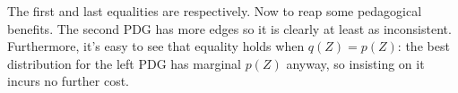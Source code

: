 \documentclass[twoside]{article}
\makeatletter
\theoremstyle{plain}
\theoremstyle{definition}
\let\H\relax
\DeclareMathOperator{\H}{\mathrm{H}} %
\DeclareMathOperator*{\Ex}{\mathbb{E}} %
\newcommand{\datadist}[1]{\Pr\nolimits_{#1}}
\newcommand\Inc{\mathit{Inc}}
\newcommand\aar{\@ifstar\aar@one@star\aar@plain}
\newcommand\aar@one@star{\@ifstar\aar@resize{\aar@plain*}}
\newcommand\aar@resize[1]{\sbox{\aar@content}{#1}\scaleleftright[3.8ex]
			{\Biggl\langle\!\!\!\!\Biggl\langle}{\usebox{\aar@content}}
			{\Biggr\rangle\!\!\!\!\Biggr\rangle}}
\makeatother
\begin{document}
The first and last equalities are  respectively.
Now to reap some pedagogical benefits.
The second PDG has more edges so it is clearly at least as inconsistent. Furthermore, it's easy to see that equality holds when $q(Z) \!=\! p(Z)$: the best distribution for the left PDG has marginal $p(Z)$ anyway, so insisting on it incurs no further cost.


\end{document}
